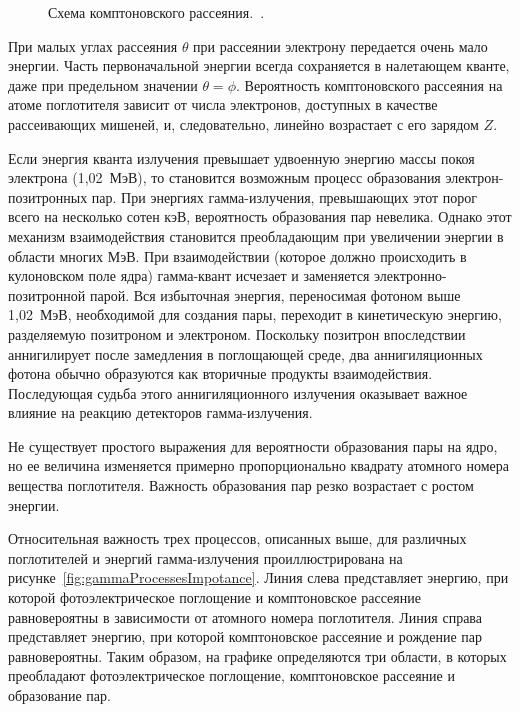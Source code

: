 \begin{figure}[ht]
  \caption{ Схема комптоновского рассеяния.~\cite{Knoll2010}.}
  \label{fig:electronComptonScattering}
\end{figure}

При малых углах рассеяния $\theta$ при рассеянии электрону передается очень мало энергии. Часть первоначальной энергии всегда сохраняется в налетающем кванте, даже при предельном значении $\theta = \phi$. Вероятность комптоновского рассеяния на атоме поглотителя зависит от числа электронов, доступных в качестве рассеивающих мишеней, и, следовательно, линейно возрастает с его зарядом $Z$.~\cite{Knoll2010}

Если энергия кванта излучения превышает удвоенную энергию массы покоя электрона (1,02~МэВ), то становится возможным процесс образования электрон-позитронных пар. При энергиях гамма-излучения, превышающих этот порог всего на несколько сотен кэВ, вероятность образования пар невелика. Однако этот механизм взаимодействия становится преобладающим при увеличении энергии в области многих МэВ. При взаимодействии (которое должно происходить в кулоновском поле ядра) гамма-квант исчезает и заменяется электронно-позитронной парой. Вся избыточная энергия, переносимая фотоном выше 1,02~МэВ, необходимой для создания пары, переходит в кинетическую энергию, разделяемую позитроном и электроном. Поскольку позитрон впоследствии аннигилирует после замедления в поглощающей среде, два аннигиляционных фотона обычно образуются как вторичные продукты взаимодействия. Последующая судьба этого аннигиляционного излучения оказывает важное влияние на реакцию детекторов гамма-излучения.~\cite{Knoll2010}

Не существует простого выражения для вероятности образования пары на ядро, но ее величина изменяется примерно пропорционально квадрату атомного номера вещества поглотителя. Важность образования пар резко возрастает с ростом энергии.~\cite{Knoll2010}

Относительная важность трех процессов, описанных выше, для различных поглотителей и энергий гамма-излучения проиллюстрирована на рисунке~\ref{fig:gammaProcessesImpotance}. Линия слева представляет энергию, при которой фотоэлектрическое поглощение и комптоновское рассеяние равновероятны в зависимости от атомного номера поглотителя. Линия справа представляет энергию, при которой комптоновское рассеяние и рождение пар равновероятны. Таким образом, на графике определяются три области, в которых преобладают фотоэлектрическое поглощение, комптоновское рассеяние и образование пар.~\cite{Knoll2010}

